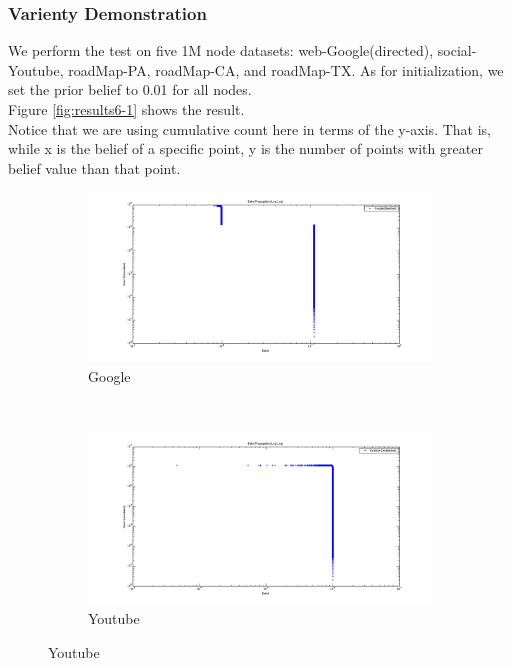 \subsubsection{Varienty Demonstration}
We perform the test on five 1M node datasets: web-Google(directed), social-Youtube, roadMap-PA, roadMap-CA, and roadMap-TX. As for initialization, we set the prior belief to 0.01 for all nodes. \\
Figure \ref{fig:results6-1} shows the result.\\
Notice that we are using cumulative count here in terms of the y-axis. That is, while x is the belief of a specific point, y is the number of points with greater belief value than that point.

\begin{figure}
    \centering
    \begin{subfigure}[htbp]{0.9\textwidth}
            \includegraphics[width=\textwidth]{FIG/bp-google.png}
            \caption{Google}
            \label{fig:bp-google}
    \end{subfigure}
    ~ %
    \begin{subfigure}[htbp]{0.9\textwidth}
            \includegraphics[width=\textwidth]{FIG/bp-youtube.png}
            \caption{Youtube}
            \label{fig:bp-youtube}
    \end{subfigure}
\end{figure} 

